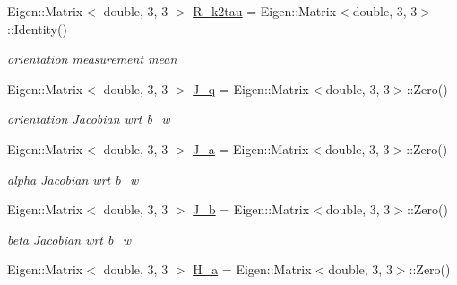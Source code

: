 \begin{DoxyCompactItemize}
\mbox{\label{classov__core_1_1CpiBase_a4ac6384285daf011340fa910df1911c7}} 
Eigen\+::\+Matrix$<$ double, 3, 3 $>$ \hyperlink{classov__core_1_1CpiBase_a4ac6384285daf011340fa910df1911c7}{R\+\_\+k2tau} = Eigen\+::\+Matrix$<$double, 3, 3$>$\+::Identity()
\begin{DoxyCompactList}\small\item\em orientation measurement mean \end{DoxyCompactList}\item 
\mbox{\label{classov__core_1_1CpiBase_a0b7922b1990897d67fedc01ee8a36f29}} 
Eigen\+::\+Matrix$<$ double, 3, 3 $>$ \hyperlink{classov__core_1_1CpiBase_a0b7922b1990897d67fedc01ee8a36f29}{J\+\_\+q} = Eigen\+::\+Matrix$<$double, 3, 3$>$\+::Zero()
\begin{DoxyCompactList}\small\item\em orientation Jacobian wrt b\+\_\+w \end{DoxyCompactList}\item 
\mbox{\label{classov__core_1_1CpiBase_a2c4b611daa13fd5b59f6b21474883058}} 
Eigen\+::\+Matrix$<$ double, 3, 3 $>$ \hyperlink{classov__core_1_1CpiBase_a2c4b611daa13fd5b59f6b21474883058}{J\+\_\+a} = Eigen\+::\+Matrix$<$double, 3, 3$>$\+::Zero()
\begin{DoxyCompactList}\small\item\em alpha Jacobian wrt b\+\_\+w \end{DoxyCompactList}\item 
\mbox{\label{classov__core_1_1CpiBase_ab8df9746f5b4628a60f98f8f949a7fa4}} 
Eigen\+::\+Matrix$<$ double, 3, 3 $>$ \hyperlink{classov__core_1_1CpiBase_ab8df9746f5b4628a60f98f8f949a7fa4}{J\+\_\+b} = Eigen\+::\+Matrix$<$double, 3, 3$>$\+::Zero()
\begin{DoxyCompactList}\small\item\em beta Jacobian wrt b\+\_\+w \end{DoxyCompactList}\item 
\mbox{\label{classov__core_1_1CpiBase_a9980c4eabf4fb2d045297138424dc02c}} 
Eigen\+::\+Matrix$<$ double, 3, 3 $>$ \hyperlink{classov__core_1_1CpiBase_a9980c4eabf4fb2d045297138424dc02c}{H\+\_\+a} = Eigen\+::\+Matrix$<$double, 3, 3$>$\+::Zero()

\end{DoxyCompactItemize}
